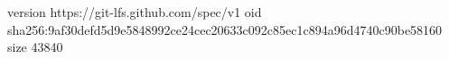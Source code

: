 version https://git-lfs.github.com/spec/v1
oid sha256:9af30defd5d9e5848992ce24cec20633c092c85ec1c894a96d4740c90be58160
size 43840

